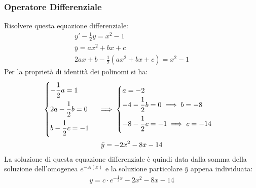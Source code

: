 \documentclass{article}
\numberwithin{equation}{subsection}
\begin{document}
\subsubsection{Operatore Differenziale}

Risolvere questa equazione differenziale:
\begin{gather*}
    y'-\displaystyle\frac{1}{2}y=x^2-1\\
    \bar{y}=ax^2+bx+c\\
    2ax+b-\displaystyle\frac{1}{2}\left(ax^2+bx+c\right)=x^2-1
\end{gather*}
Per la proprietà di identità dei polinomi si ha:
\begin{gather*}
    \begin{cases}
        \displaystyle-\frac{\strut 1}{\strut 2}a=1\\
        2a-\displaystyle\frac{\strut1}{\strut2}b=0\\
        b-\displaystyle\frac{\strut1}{\strut2}c=-1
    \end{cases}\implies\begin{cases}
        a=-2\\
        -4-\displaystyle\frac{\strut1}{\strut2}b=0\implies b=-8\\
        -8-\displaystyle\frac{\strut1}{\strut2}c=-1\implies c=-14
    \end{cases}\\
    \bar{y}=-2x^2-8x-14
\end{gather*}
La soluzione di questa equazione differenziale è quindi data dalla somma della soluzione dell'omogenea $e^{-A(x)}$ e la soluzione particolare $\bar{y}$ appena individuata:
\begin{gather*}
    y=c\cdot e^{-\frac{1}{2}x}-2x^2-8x-14
\end{gather*}
\end{document}
